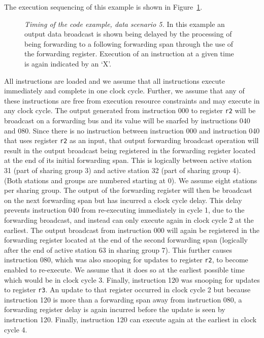 \documentclass[10pt,dvips]{article}
\begin{document}
The execution sequencing of this example is shown in
Figure~\ref{ex5}.

\begin{figure}
\centering
{}
\caption{{\em Timing of the code example, data scenario 5.}
In this example an output data broadcast is shown being
delayed by the processing of being forwarding
to a following forwarding span through the use
of the forwarding register.
Execution of an instruction at a given time is
again indicated by an `X'.}
\label{ex5}
\end{figure}

All instructions are loaded and we assume that all
instructions execute immediately and complete in one clock cycle.
Further, we assume that any of these instructions are free
from execution resource constraints and may execute in any clock cycle.
The output generated from instruction 000 to register
{\tt r2}
will be broadcast on a forwarding bus and its value will be snarfed
by instructions 040 and 080.  Since there is no instruction
between instruction 000 and instruction 040 that uses 
register
{\tt r2} as an input,
that output forwarding broadcast operation will result
in the output broadcast being registered in the forwarding register
located at the end of its initial forwarding span.  This
is logically between active station 31 (part of sharing group 3)
and active station 32 (part of sharing group 4). (Both stations
and groups are numbered starting at 0). We assume eight stations
per sharing group.
The output of the forwarding register will then be broadcast
on the next forwarding span but has incurred a clock cycle delay.
This delay prevents instruction 040 from re-executing immediately
in cycle 1, due to the forwarding broadcast,
and instead can only execute again in clock cycle 2
at the earliest.  The output broadcast from instruction 000
will again be registered in the forwarding register located
at the end of the second forwarding span (logically after the
end of active station 63 in sharing group 7).
This further causes instruction 080,
which was also snooping for updates to register
{\tt r2},
to become enabled to re-execute.  We assume that it does so
at the earliest possible time which would be in clock cycle 3.
Finally, instruction 120 was snooping for updates to register
{\tt r3}.
An update to that register occurred in clock cycle 2 but because
instruction 120 is more than a forwarding span away from instruction
080, a forwarding register delay is again incurred before the update
is seen by instruction 120.  Finally, instruction 120 can execute
again at the earliest in clock cycle 4.
\end{document}

